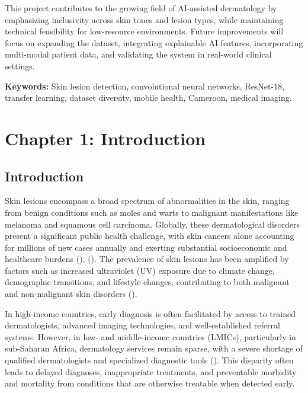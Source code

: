 \documentclass[
  12pt,
  oneside]{article}
\begin{document}
This project contributes to the growing field of AI-assisted dermatology by emphasizing inclusivity across skin tones and lesion types, while maintaining technical feasibility for low-resource environments. Future improvements will focus on expanding the dataset, integrating explainable AI features, incorporating multi-modal patient data, and validating the system in real-world clinical settings.

\vspace{1cm}
\noindent\textbf{Keywords:} Skin lesion detection, convolutional neural networks, ResNet-18, transfer learning, dataset diversity, mobile health, Cameroon, medical imaging.

\vfill
\clearpage

{
\setcounter{tocdepth}{3}
\tableofcontents
}
\newpage

\listoffigures
\newpage

\newpage

\section{Chapter 1: Introduction}\label{chapter-1-introduction}

\subsection{Introduction}\label{introduction}

Skin lesions encompass a broad spectrum of abnormalities in the skin,
ranging from benign conditions such as moles and warts to malignant
manifestations like melanoma and squamous cell carcinoma. Globally,
these dermatological disorders present a significant public health
challenge, with skin cancers alone accounting for millions of new cases
annually and exerting substantial socioeconomic and healthcare burdens
(),
(). The prevalence
of skin lesions has been amplified by factors such as increased
ultraviolet (UV) exposure due to climate change, demographic
transitions, and lifestyle changes, contributing to both malignant and
non-malignant skin disorders ().

In high-income countries, early diagnosis is often facilitated by access
to trained dermatologists, advanced imaging technologies, and
well-established referral systems. However, in low- and middle-income
countries (LMICs), particularly in sub-Saharan Africa, dermatology
services remain sparse, with a severe shortage of qualified
dermatologists and specialized diagnostic tools
(). This disparity often
leads to delayed diagnoses, inappropriate treatments, and preventable
morbidity and mortality from conditions that are otherwise treatable
when detected early.
\end{document}
